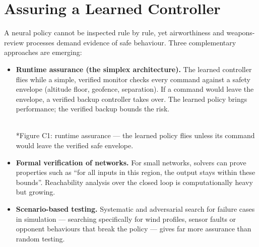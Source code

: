 \documentclass[11pt]{article}
\begin{document}
\section{Assuring a Learned Controller}
A neural policy cannot be inspected rule by rule, yet airworthiness and weapons-review processes demand evidence of safe behaviour. Three complementary approaches are emerging:
\begin{itemize}
\item \textbf{Runtime assurance (the simplex architecture).} The learned controller flies while a simple, verified monitor checks every command against a safety envelope (altitude floor, geofence, separation). If a command would leave the envelope, a verified backup controller takes over. The learned policy brings performance; the verified backup bounds the risk.
\begin{center}\\*{\small\color{GreyN}Figure C1: runtime assurance --- the learned policy flies unless its command would leave the verified safe envelope.}\end{center}
\item \textbf{Formal verification of networks.} For small networks, solvers can prove properties such as ``for all inputs in this region, the output stays within these bounds''. Reachability analysis over the closed loop is computationally heavy but growing.
\item \textbf{Scenario-based testing.} Systematic and adversarial search for failure cases in simulation --- searching specifically for wind profiles, sensor faults or opponent behaviours that break the policy --- gives far more assurance than random testing.
\end{itemize}
\end{document}
